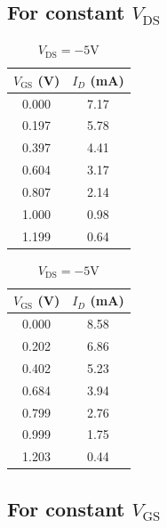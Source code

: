 \documentclass[%
sor,
 jor,
 amsmath,amssymb,
 reprint,
]{revtex4-2}
\begin{document}
\subsection{For constant $V_{\text{DS}}$}
\begin{table}[H]
\begin{minipage}{0.48\linewidth}
	\begin{center}
\begin{tabular}{|c|c|}
\hline
$V_{\text{GS}}$  (V) & $I_D$ (mA) \\
\hline
0.000 & 7.17 \\
0.197 & 5.78 \\
0.397 & 4.41 \\
0.604 & 3.17 \\
0.807 & 2.14 \\
1.000 & 0.98 \\
1.199 & 0.64 \\
\hline
\end{tabular}
\caption{$V_{\text{DS}} = -2.65\si{\volt}$}
\end{center}
\end{minipage}
\begin{minipage}{0.48\linewidth}
	\begin{center}


\begin{tabular}{|c|c|}
\hline
$V_{\text{GS}}$  (V) & $I_D$ (mA) \\
\hline
0.000 & 8.58 \\
0.202 & 6.86 \\
0.402 & 5.23 \\
0.684 & 3.94 \\
0.799 & 2.76 \\
0.999 & 1.75 \\
1.203 & 0.44 \\
\hline
\end{tabular}
\caption{$V_{\text{DS}} = -5\si{\volt}$}
\end{center}
\end{minipage}
\hfill

\subsection{	For constant $V_{\text{GS}}$}
\vspace{3mm}
\begin{minipage}{0.30\linewidth}
	\begin{center}


\end{center}
\end{minipage}
\end{table}
\end{document}
